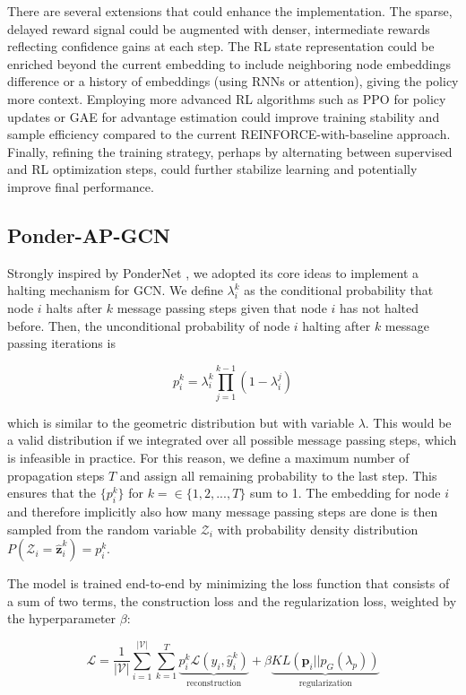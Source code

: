 \documentclass{gdl}
\begin{document}
There are several extensions that could enhance the implementation. The sparse, delayed reward signal could be augmented with denser, intermediate rewards reflecting confidence gains at each step. The RL state representation could be enriched beyond the current embedding to include neighboring node embeddings difference or a history of embeddings (using RNNs or attention), giving the policy more context. Employing more advanced RL algorithms such as PPO for policy updates or GAE for advantage estimation could improve training stability and sample efficiency compared to the current REINFORCE-with-baseline approach. Finally, refining the training strategy, perhaps by alternating between supervised and RL optimization steps, could further stabilize learning and potentially improve final performance.

\subsection{Ponder-AP-GCN}
Strongly inspired by PonderNet \cite{banino2021}, we adopted its core ideas to implement a halting mechanism for GCN. We define $\lambda_i^k$ as the conditional probability that node $i$ halts after $k$ message passing steps given that node $i$ has not halted before. Then, the unconditional probability of node $i$ halting after $k$ message passing iterations is

\begin{equation}
p_i^k = \lambda_i^k \prod_{j=1}^{k-1} (1-\lambda_i^j)
\end{equation}

\noindent which is similar to the geometric distribution but with variable $\lambda$. This would be a valid distribution if we integrated over all possible message passing steps, which is infeasible in practice. For this reason, we define a maximum number of propagation steps $T$ and assign all remaining probability to the last step. This ensures that the $\{p_i^k\}$ for $k = \in \{1,2,...,T\}$ sum to 1. The embedding for node $i$ and therefore implicitly also how many message passing steps are done is then sampled from the random variable $\mathcal{Z}_i$ with probability density distribution $P(\mathcal{Z}_i=\hat{\mathbf{z}}_i^k) = p_i^k$.

The model is trained end-to-end by minimizing the loss function that consists of a sum of two terms, the construction loss and the regularization loss, weighted by the hyperparameter $\beta$:

\begin{equation}
\mathcal{L} = \frac{1}{|\mathcal{V}|} \sum_{i=1}^{\mathcal{|V|}} \sum_{k=1}^{T} \underbrace{p_i^k \mathcal{L}(y_i, \hat{y}_i^k)}_{\text{reconstruction}} + \beta \underbrace{KL(\mathbf{p}_i || p_G(\lambda_p))}_{\text{regularization}}
\label{eq:ponder-loss}
\end{equation}
\end{document}

